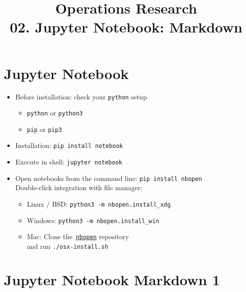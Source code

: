 \documentclass[11pt]{extarticle}
\begin{document}
\title{\texorpdfstring{\vspace{15mm} Operations Research\\ 02. Jupyter Notebook: Markdown}{Operations Research\\ 02. Jupyter Notebook: Markdown}} 
\author{}
\date{}
\maketitle
\newpage

\section*{Jupyter Notebook}

\begin{itemize}
  \item Before installation: check your {\tt python} setup
    \begin{itemize}
      \item {\tt python} or {\tt python3}
      \item {\tt pip} or {\tt pip3}
    \end{itemize}
  \item Installation: {\tt pip install notebook}
  \item Execute in shell: {\tt jupyter notebook}
  \item Open notebooks from the command line: {\tt pip install nbopen} \\
    Double-click integration with file manager:
    \begin{itemize}
      \item Linux / BSD: {\tt python3 -m nbopen.install\_xdg}
      \item Windows: {\tt python3 -m nbopen.install\_win}
      \item Mac: Clone the \href{https://github.com/takluyver/nbopen}{$\,${\tt nbopen}} repository \\ and run {\tt ./osx-install.sh}
    \end{itemize}
\end{itemize}

\newpage

\section*{Jupyter Notebook Markdown 1}
\end{document}
